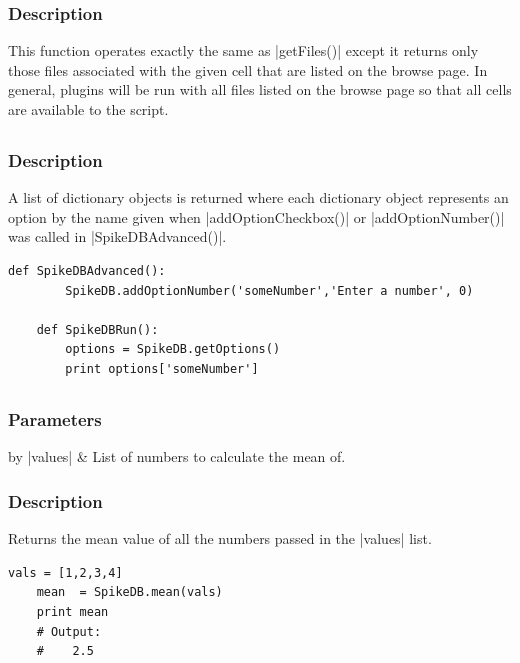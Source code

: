 \documentclass{report}
\begin{document}
\subsubsection{Description}
This function operates exactly the same as |getFiles()| except it returns only those files associated with the given cell that are listed on the browse page. In general, plugins will be run with all files listed on the browse page so that all cells are available to the script. 

\clearpage
\subsection{}
\subsubsection{Description}
A list of dictionary objects is returned where each dictionary object represents an option by the name given when |addOptionCheckbox()| or |addOptionNumber()| was called in |SpikeDBAdvanced()|. 
\begin{lstlisting}[caption=Example]
	def SpikeDBAdvanced():
		SpikeDB.addOptionNumber('someNumber','Enter a number', 0)

	def SpikeDBRun():
		options = SpikeDB.getOptions()
		print options['someNumber']
\end{lstlisting}


\clearpage
\subsection[\method{float}{mean}]{}
\subsubsection{Parameters}
\begin{table}[h]
\begin{center}
\begin{tabular}{by}
		|values| & List of numbers to calculate the mean of.\\
	\end{tabular}
\end{center}
\end{table}
\subsubsection{Description}
Returns the mean value of all the numbers passed in the |values| list.
\begin{lstlisting}[caption=Example]
	vals = [1,2,3,4]
	mean  = SpikeDB.mean(vals)
	print mean
	# Output:
	#    2.5
\end{lstlisting}
\end{document}
